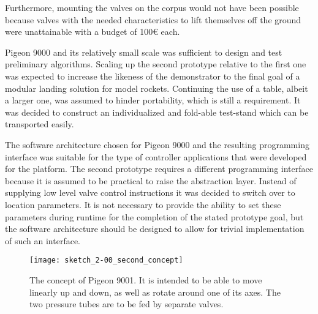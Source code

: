 Furthermore, mounting the valves on the corpus would not have been possible because valves with the needed characteristics to lift themselves off the ground were unattainable with a budget of 100€ each.

Pigeon 9000 and its relatively small scale was sufficient to design and test preliminary algorithms. Scaling up the second prototype relative to the first one was expected to increase the likeness of the demonstrator to the final goal of a modular landing solution for model rockets. Continuing the use of a table, albeit a larger one, was assumed to hinder portability, which is still a requirement. It was decided to construct an individualized and fold-able test-stand which can be transported easily.

The software architecture chosen for Pigeon 9000 and the resulting programming interface was suitable for the type of controller applications that were developed for the platform. The second prototype requires a different programming interface because it is assumed to be practical to raise the abstraction layer. Instead of supplying low level valve control instructions it was decided to switch over to location parameters. It is not necessary to provide the ability to set these parameters during runtime for the completion of the stated prototype goal, but the software architecture should be designed to allow for trivial implementation of such an interface.

\begin{figure}[H]
\centering

\texttt{[image: sketch\_2-00\_second\_concept]}

\caption{The concept of Pigeon 9001. It is intended to be able to move linearly up and down, as well as rotate around one of its axes. The two pressure tubes are to be fed by separate valves.}
\end{figure}